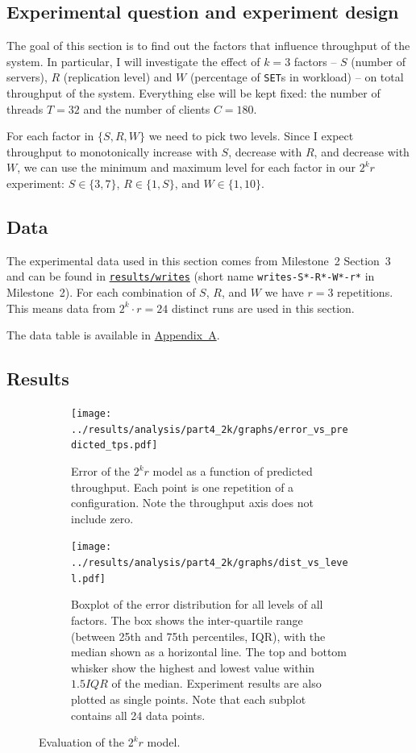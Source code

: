 \documentclass[11pt]{article}
\newcommand{\set}[0]{\texttt{SET}}
\begin{document}
\subsection{Experimental question and experiment design}
The goal of this section is to find out the factors that influence throughput of the system. In particular, I will investigate the effect of $k=3$ factors -- $S$ (number of servers), $R$ (replication level) and $W$ (percentage of \set{}s in workload) -- on total throughput of the system. Everything else will be kept fixed: the number of threads $T=32$ and the number of clients $C=180$.

For each factor in $\{S,R,W\}$ we need to pick two levels. Since I expect throughput to monotonically increase with $S$, decrease with $R$, and decrease with $W$, we can use the minimum and maximum level for each factor in our $2^kr$ experiment: $S \in \{3, 7\}$, $R \in \{1, S\}$, and $W \in \{1, 10\}$.


\subsection{Data}

The experimental data used in this section comes from Milestone~2 Section~3 and can be found in \texttt{\href{https://gitlab.inf.ethz.ch/pungast/asl-fall16-project/tree/master/results/writes}{results/writes}} (short name \texttt{writes-S*-R*-W*-r*} in Milestone~2). For each combination of $S$, $R$, and $W$ we have $r=3$ repetitions. This means data from $2^k \cdot r = 24$ distinct runs are used in this section.

The data table is available in \hyperref[sec:appa]{Appendix~A}.

%

\subsection{Results}

\begin{figure}[h]
\centering
\begin{subfigure}[t]{0.49\textwidth}
\centering
\texttt{[image: ../results/analysis/part4\_2k/graphs/error\_vs\_predicted\_tps.pdf]}
\caption{Error of the $2^kr$ model as a function of predicted throughput. Each point is one repetition of a configuration. Note the throughput axis does not include zero.}
\label{fig:part4:errorvspredicted}
\end{subfigure}
\begin{subfigure}[t]{0.49\textwidth}
\centering
\texttt{[image: ../results/analysis/part4\_2k/graphs/dist\_vs\_level.pdf]}
\caption{Boxplot of the error distribution for all levels of all factors. The box shows the inter-quartile range (between 25th and 75th percentiles, IQR), with the median shown as a horizontal line. The top and bottom whisker show the highest and lowest value within $1.5 IQR$ of the median. Experiment results are also plotted as single points. Note that each subplot contains all 24 data points.}
\label{fig:part4:errordistvslevel}
\end{subfigure}
\caption{Evaluation of the $2^kr$ model.}
\end{figure}
\end{document}
